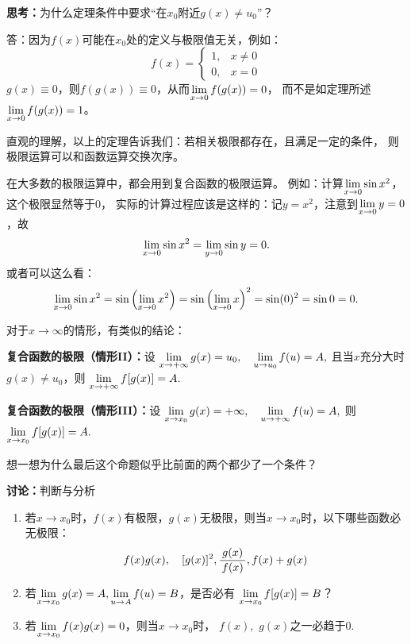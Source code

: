 \bs
{\bf 思考：}为什么定理条件中要求“在$x_0$附近$g(x)\ne u_0$”？

\ifhint
  答：因为$f(x)$可能在$x_0$处的定义与极限值无关，例如：
  $$f(x)=\left\{\begin{array}{ll}
  1,&x\ne0\\0,&x=0
  \end{array}\right.$$
  $g(x)\equiv 0$，则$f(g(x))\equiv0$，从而$\lim\limits_{x\to{0}}f(g(x))=0$，
  而不是如定理所述$\lim\limits_{x\to{0}}f(g(x))=1$。
\fi

直观的理解，以上的定理告诉我们：若相关极限都存在，且满足一定的条件，
则极限运算可以和函数运算交换次序。

在大多数的极限运算中，都会用到复合函数的极限运算。
例如：计算$\lim\limits_{x\to{0}}\sin x^2$，这个极限显然等于$0$，
实际的计算过程应该是这样的：记$y=x^2$，注意到$\lim\limits_{x\to{0}}y=0$，故
$$\lim\limits_{x\to{0}}\sin x^2=\lim_{y\to0}\sin y=0.$$
或者可以这么看：
$$\lim\limits_{x\to{0}}\sin x^2=\sin\left(\lim\limits_{x\to{0}}x^2\right)
=\sin\left(\lim\limits_{x\to{0}}x\right)^2
=\sin(0)^2=\sin0=0.$$

\bs
对于$x\to\infty$的情形，有类似的结论：
\begin{thx}
	{\bf 复合函数的极限（情形II）：}设
	$\lim\limits_{x\to{+\infty}}g(x)=u_0,\quad\lim\limits_{u\to u_0}f(u)=A,$
	且当$x$充分大时$g(x)\ne u_0$，则
	$\lim\limits_{x\to{+\infty}}f[g(x)]=A.$

	{\bf 复合函数的极限（情形III）：}设
	$\lim\limits_{x\to{x_0}}g(x)=+\infty,\quad\lim\limits_{u\to+\infty}f(u)=A,$
	则
	$\lim\limits_{x\to{x_0}}f[g(x)]=A.$
\end{thx}
想一想为什么最后这个命题似乎比前面的两个都少了一个条件？

\bs

{\bf 讨论：}判断与分析
\begin{enumerate}[(1)]
  \setlength{\itemindent}{1cm}
  \item 若$x\to x_0$时，$f(x)$有极限，$g(x)$无极限，则当$x\to x_0$时，以下哪些函数必无极限：
  $$f(x)g(x),\quad [g(x)]^2,\displaystyle\frac{\,{g(x)}\,}{\,{f(x)}\,}, f(x)+g(x)$$ 
  \item 若$\lim\limits_{x\to{x_0}}g(x)=A,\lim\limits_{u\to A}f(u)=B$，是否必有
  $\lim\limits_{x\to{x_0}}f[g(x)]=B$？
  \item 若$\lim\limits_{x\to{x_0}}f(x)g(x)=0$，则当$x\to
  x_0$时， $f(x),$ $g(x)$之一必趋于$0$.
\end{enumerate}

